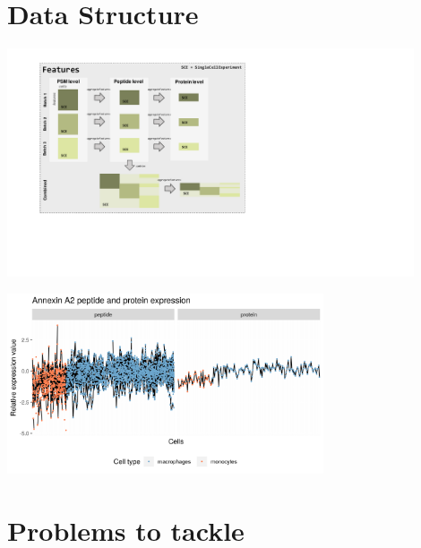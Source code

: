 \documentclass{article}
\begin{document}
\begin{multicols}{2}
\begin{minipage}[t]{\linewidth}
\end{minipage}

\noindent
\begin{minipage}[t]{\linewidth}
  \vspace{0.55cm}
  \section*{\huge Data Structure}
  \begin{center}
    \includegraphics[width=0.9\textwidth, trim={2.6cm 5cm 14cm 1cm},clip]{figs/Features.pdf}
  \end{center}
  \hspace{3.5cm} \includegraphics[width=0.7\textwidth]{figs/annexinA2.png}
\end{minipage}


\noindent
\begin{minipage}[t]{\linewidth}
  \vspace{0.35cm}
  \section*{\huge Problems to tackle}
  \vspace{0.15cm}
\end{minipage}
  

\end{multicols}
\end{document}

